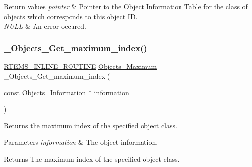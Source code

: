 \begin{DoxyRetVals}{Return values}
{\em pointer} & Pointer to the Object Information Table for the class of objects which corresponds to this object ID. \\
\hline
{\em N\+U\+LL} & An error occured. \\
\hline
\end{DoxyRetVals}
\mbox{\label{group__RTEMSScoreObject_gadf825a94fecd0945a4368e503e274bfd}} 
\subsubsection{\texorpdfstring{\_Objects\_Get\_maximum\_index()}{\_Objects\_Get\_maximum\_index()}}
{\footnotesize\ttfamily \mbox{\hyperlink{group__RTEMSScoreBaseDefs_gac216239df231d5dbd15e3520b0b9313f}{R\+T\+E\+M\+S\+\_\+\+I\+N\+L\+I\+N\+E\+\_\+\+R\+O\+U\+T\+I\+NE}} \mbox{\hyperlink{group__RTEMSScoreObject_gaa2735357885ec7d7157c32f3f835f9ae}{Objects\+\_\+\+Maximum}} \+\_\+\+Objects\+\_\+\+Get\+\_\+maximum\+\_\+index (\begin{DoxyParamCaption}\item[{const \mbox{\hyperlink{structObjects__Information}{Objects\+\_\+\+Information}} $\ast$}]{information }\end{DoxyParamCaption})}



Returns the maximum index of the specified object class. 


\begin{DoxyParams}{Parameters}
{\em information} & The object information.\\
\hline
\end{DoxyParams}
\begin{DoxyReturn}{Returns}
The maximum index of the specified object class. 
\end{DoxyReturn}
\mbox{\label{group__RTEMSScoreObject_gaaa126abc5988d998acc3b6c9f39c3bee}} 

